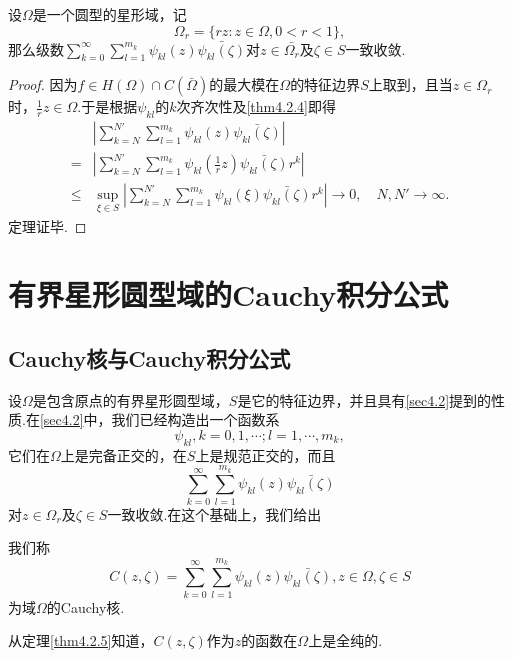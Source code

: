\begin{theorem}\label{thm4.2.5}
	设$\Omega$是一个圆型的星形域，记
	\[\Omega_r=\{rz\colon z\in\Omega,0<r<1\},\]
	那么级数$\sum\limits_{k=0}^\infty \sum_{l=1}^{m_k}\psi_{kl}(z)\bar{\psi_{kl}(\zeta)}$对$z\in\bar{\Omega_r}$及$\zeta\in S$一致收敛.
\end{theorem}
\begin{proof}
	因为$f\in H(\Omega)\cap C(\bar{\Omega})$的最大模在$\Omega$的特征边界$S$上取到，且当$z\in\Omega_r$时，$\frac1r z\in\Omega$.于是根据$\psi_{kl}$的$k$次齐次性及\ref{thm4.2.4}即得
	\begin{align*}
		&\left|\sum_{k=N}^{N'}\sum_{l=1}^{m_k}\psi_{kl}(z)\bar{\psi_{kl}(\zeta)}\right|\\
		=&\left|\sum_{k=N}^{N'}\sum_{l=1}^{m_k}\psi_{kl}\left(\frac1r z\right)\bar{\psi_{kl}(\zeta)}r^k\right|\\
		\le&\sup_{\xi\in S}\left|\sum_{k=N}^{N'}\sum_{l=1}^{m_k}\psi_{kl}(\xi)\bar{\psi_{kl}(\zeta)}r^k\right|\to0,\quad N,N'\to\infty.
	\end{align*}
定理证毕.
\end{proof}
\section{有界星形圆型域的Cauchy积分公式\label{sec4.3}}
\subsection{Cauchy核与Cauchy积分公式}
设$\Omega$是包含原点的有界星形圆型域，$S$是它的特征边界，并且具有\ref{sec4.2}提到的性质.在\ref{sec4.2}中，我们已经构造出一个函数系
\[\psi_{kl},k=0,1,\cdots;l=1,\cdots,m_k,\]
它们在$\Omega$上是完备正交的，在$S$上是规范正交的，而且
\[\sum\limits_{k=0}^\infty \sum_{l=1}^{m_k}\psi_{kl}(z)\bar{\psi_{kl}(\zeta)}\]
对$z\in\Omega_r$及$\zeta\in S$一致收敛.在这个基础上，我们给出
\begin{definition}\label{def4.3.1}
	我们称
	\[C(z,\zeta)=\sum_{k=0}^{\infty}\sum_{l=1}^{m_k}\psi_{kl}(z)\bar{\psi_{kl}(\zeta)},z\in\Omega,\zeta\in S\]
	为域$\Omega$的Cauchy核.
\end{definition}
从定理\ref{thm4.2.5}知道，$C(z,\zeta)$作为$z$的函数在$\Omega$上是全纯的.

